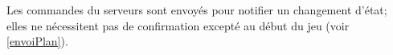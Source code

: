 \par

Les commandes du serveurs sont envoyés pour notifier un changement d'état; elles ne nécessitent pas de confirmation excepté au début du jeu (voir \ref{envoiPlan}). \\